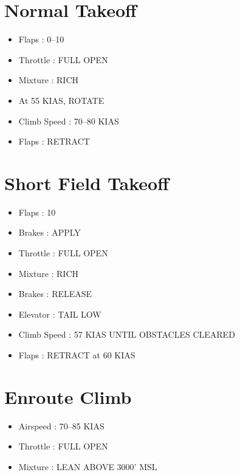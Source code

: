 \chapter{Normal Takeoff}
\label{normaltakeoff}

\begin{itemize}
\item{} Flaps : 0--10

\item{} Throttle : FULL OPEN

\item{} Mixture : RICH

\item{} At 55 KIAS, ROTATE

\item{} Climb Speed : 70--80 KIAS

\item{} Flaps : RETRACT

\end{itemize}

\chapter{Short Field Takeoff}
\label{shortfieldtakeoff}

\begin{itemize}
\item{} Flaps : 10

\item{} Brakes : APPLY

\item{} Throttle : FULL OPEN

\item{} Mixture : RICH

\item{} Brakes : RELEASE

\item{} Elevator : TAIL LOW

\item{} Climb Speed : 57 KIAS UNTIL OBSTACLES CLEARED

\item{} Flaps : RETRACT at 60 KIAS

\end{itemize}

\chapter{Enroute Climb}
\label{enrouteclimb}

\begin{itemize}
\item{} Airspeed : 70--85 KIAS

\item{} Throttle : FULL OPEN

\item{} Mixture : LEAN ABOVE 3000' MSL

\end{itemize}


